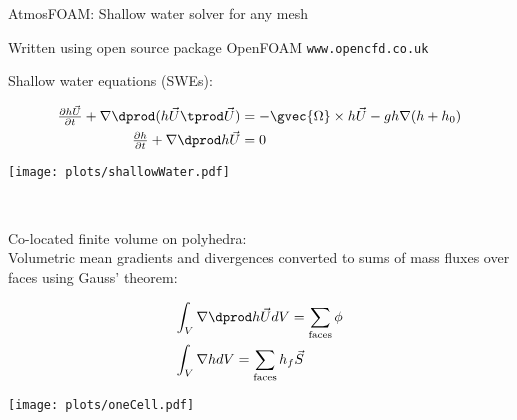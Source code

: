 \begin{slide}
{
    AtmosFOAM: Shallow water solver for any mesh
}

\vspace{20pt}
\begin{list0}

\item Written using open source package OpenFOAM {\tt www.opencfd.co.uk}

\vspace{-20pt}
\item
\begin{minipage}[t]{0.17\linewidth}\raggedright
Shallow water equations {\small(SWEs)}:
\end{minipage}
\begin{minipage}[c]{0.52\linewidth}\vspace{-10pt}\begin{align*}
    \tfrac{\partial h \vec{U}}{\partial t} + \nabla \dprod (h \vec{U} \tprod \vec{U})
    &= -\gvec{\Omega} \times h\vec{U} - g h \nabla (h + h_0) \\
    \tfrac{\partial h}{\partial t} + \nabla \dprod h \vec{U} &= 0
\end{align*}\end{minipage}
\begin{minipage}[c]{0.24\linewidth}\vspace{20pt}
\texttt{[image: plots/shallowWater.pdf]}
\end{minipage}
\\  \vspace{-40pt}

\item
\begin{minipage}[t]{0.4\linewidth}\raggedright
    Co-located finite volume on polyhedra: \\
    Volumetric mean gradients and divergences converted to sums of mass fluxes over faces using Gauss' theorem:
\end{minipage}
\begin{minipage}[c]{0.28\linewidth}\vspace{40pt}\begin{align*}
\int_V \nabla & \dprod h\vec{U} dV = \sum_\text{faces}\phi\\
\int_V \nabla & h dV = \sum_\text{faces}h_f \vec{S}
\end{align*}\end{minipage}
\begin{minipage}[c]{0.25\linewidth}\vspace{50pt}
\texttt{[image: plots/oneCell.pdf]}
\end{minipage}


\end{list0}
\end{slide}
